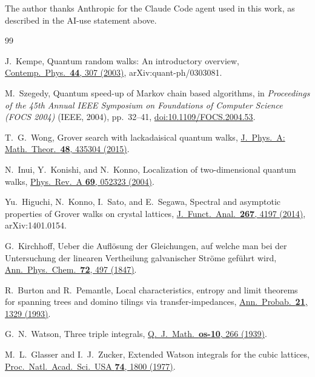 \documentclass[aps,pra,10pt,twocolumn,superscriptaddress,nofootinbib]{revtex4-2}
\begin{document}
\begin{acknowledgments}
The author thanks Anthropic for the Claude Code agent used in this work, as described in the
AI-use statement above.
\end{acknowledgments}

\begin{thebibliography}{99}

J.~Kempe,
Quantum random walks: An introductory overview,
\href{https://doi.org/10.1080/00107151031000110776}{Contemp.\ Phys.\ \textbf{44}, 307 (2003)},
arXiv:quant-ph/0303081.

M.~Szegedy,
Quantum speed-up of Markov chain based algorithms,
in \emph{Proceedings of the 45th Annual IEEE Symposium on Foundations of Computer Science (FOCS 2004)}
(IEEE, 2004), pp.~32--41,
\href{https://doi.org/10.1109/FOCS.2004.53}{doi:10.1109/FOCS.2004.53}.

T.~G.~Wong,
Grover search with lackadaisical quantum walks,
\href{https://doi.org/10.1088/1751-8113/48/43/435304}{J.\ Phys.\ A: Math.\ Theor.\ \textbf{48}, 435304 (2015)}.

N.~Inui, Y.~Konishi, and N.~Konno,
Localization of two-dimensional quantum walks,
\href{https://doi.org/10.1103/PhysRevA.69.052323}{Phys.\ Rev.\ A \textbf{69}, 052323 (2004)}.

Yu.~Higuchi, N.~Konno, I.~Sato, and E.~Segawa,
Spectral and asymptotic properties of Grover walks on crystal lattices,
\href{https://doi.org/10.1016/j.jfa.2014.09.003}{J.\ Funct.\ Anal.\ \textbf{267}, 4197 (2014)}, arXiv:1401.0154.

G.~Kirchhoff,
Ueber die Aufl\"osung der Gleichungen, auf welche man bei der Untersuchung der linearen
Vertheilung galvanischer Str\"ome gef\"uhrt wird,
\href{https://doi.org/10.1002/andp.18471481202}{Ann.\ Phys.\ Chem.\ \textbf{72}, 497 (1847)}.

R.~Burton and R.~Pemantle,
Local characteristics, entropy and limit theorems for spanning trees and domino tilings via
transfer-impedances,
\href{https://doi.org/10.1214/aop/1176989121}{Ann.\ Probab.\ \textbf{21}, 1329 (1993)}.

G.~N.~Watson,
Three triple integrals,
\href{https://doi.org/10.1093/qmath/os-10.1.266}{Q.\ J.\ Math.\ \textbf{os-10}, 266 (1939)}.

M.~L.~Glasser and I.~J.~Zucker,
Extended Watson integrals for the cubic lattices,
\href{https://doi.org/10.1073/pnas.74.5.1800}{Proc.\ Natl.\ Acad.\ Sci.\ USA \textbf{74}, 1800 (1977)}.


\end{thebibliography}
\end{document}
